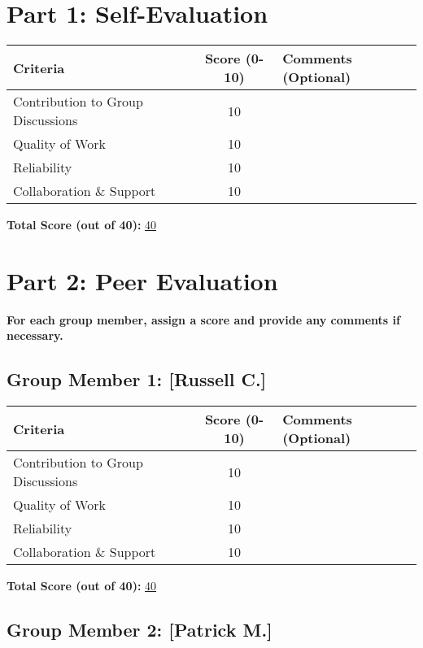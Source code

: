 \documentclass{article}
\begin{document}
\section*{Part 1: Self-Evaluation}

\begin{tabular}{|l|c|p{7cm}|}
\hline
\textbf{Criteria} & \textbf{Score (0-10)} & \textbf{Comments (Optional)} \\ \hline
Contribution to Group Discussions & 10 & \\ \hline
Quality of Work & 10 & \\ \hline
Reliability & 10 & \\ \hline
Collaboration \& Support & 10 & \\ \hline
\end{tabular}

\vspace{0.5cm}
\textbf{Total Score (out of 40):} \underline{\hspace{3cm}40}

\section*{Part 2: Peer Evaluation}

\textbf{For each group member, assign a score and provide any comments if necessary.}

\subsection*{Group Member 1: [Russell C.]}

\begin{tabular}{|l|c|p{7cm}|}
\hline
\textbf{Criteria} & \textbf{Score (0-10)} & \textbf{Comments (Optional)} \\ \hline
Contribution to Group Discussions & 10 & \\ \hline
Quality of Work & 10 & \\ \hline
Reliability & 10 & \\ \hline
Collaboration \& Support & 10 & \\ \hline
\end{tabular}

\vspace{0.5cm}
\textbf{Total Score (out of 40):} \underline{\hspace{3cm}40}

\subsection*{Group Member 2: [Patrick M.]}
\end{document}
